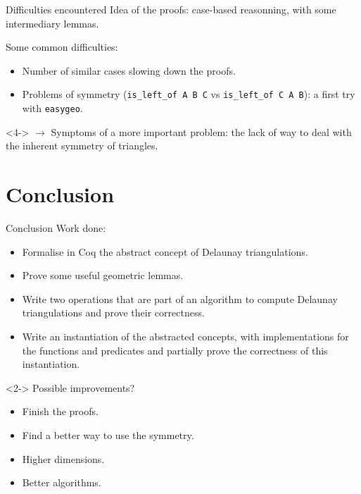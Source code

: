\documentclass[18pt]{beamer}
\begin{document}
\begin{frame}{Difficulties encountered}
Idea of the proofs: case-based reasonning, with some intermediary lemmas.

Some common difficulties:
\begin{itemize}
 \item<2-> Number of similar cases slowing down the proofs.
 \item<3-> Problems of symmetry ({\tt is\_left\_of A B C} vs {\tt is\_left\_of C A B}): a first try with {\tt easygeo}.
\end{itemize}

\begin{uncoverenv}<4->
$\rightarrow$ Symptoms of a more important problem: the lack of way to deal with the inherent symmetry of triangles.
\end{uncoverenv}


\end{frame}


\section{Conclusion}
\begin{frame}{Conclusion}
Work done:
\begin{itemize}
 \item Formalise in Coq the abstract concept of Delaunay triangulations.
 \item Prove some useful geometric lemmas.
 \item Write two operations that are part of an algorithm to compute Delaunay triangulations and prove their correctness.
 \item Write an instantiation of the abstracted concepts, with implementations for the functions and predicates and partially prove the correctness of this instantiation.
 \end{itemize}

\begin{uncoverenv}<2->
Possible improvements?
\begin{itemize}
 \item Finish the proofs.
 \item Find a better way to use the symmetry.
 \item Higher dimensions.
 \item Better algorithms.
\end{itemize}
\end{uncoverenv}

\end{frame}
\end{document}
